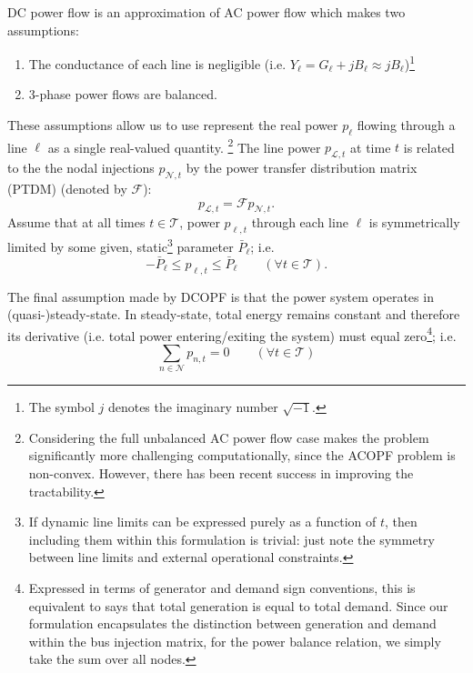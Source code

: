 \documentclass[journal,11pt]{IEEEtran}
\renewcommand{\L}{\mathcal{L}}
\newcommand{\T}{\mathcal{T}}
\newcommand{\N}{\mathcal{N}}
\begin{document}
DC power flow is an approximation of AC power flow which makes two assumptions:
\begin{enumerate}
  \item The conductance of each line is negligible (i.e. $Y_{\ell} = G_\ell + j B_\ell \approx j B_\ell$)\footnote{
    The symbol $j$ denotes the imaginary number $\sqrt{-1}$.
  }
  \item 3-phase power flows are balanced.
\end{enumerate}

These assumptions allow us to use represent the real power $p_{\ell}$ flowing through a line $\ell$ as a single
real-valued quantity.  \footnote{
  Considering the full unbalanced AC power flow case makes the problem significantly more
  challenging computationally, since the ACOPF problem is non-convex. However, there has been recent success in
  improving the tractability.\cite{vito_learning_2024}
} The line power $p_{\L, t}$ at time $t$ is related to the the nodal injections $p_{\N,t}$ by the power transfer
distribution matrix (PTDM) (denoted by $\mathcal{F}$):
\begin{equation}
  p_{\L, t} = \mathcal{F} p_{\N, t}.
\end{equation}
Assume that at all times $t\in\T$, power $p_{\ell,t}$ through each line $\ell$ is symmetrically limited by some given, 
static\footnote{
  If dynamic line limits can be expressed purely as a function of $t$, then including them within this formulation
  is trivial: just note the symmetry between line limits and external operational constraints.
}
parameter $\bar{P}_\ell$; i.e.
\begin{equation}
  -\bar{P}_\ell \leq p_{\ell,t} \leq \bar{P}_\ell  \qquad (\forall t\in\T).
\end{equation}



The final assumption made by DCOPF is that the power system operates in (quasi-)steady-state. In steady-state,
total energy remains constant and therefore its derivative (i.e. total power entering/exiting the system) must equal zero\footnote{
  Expressed in terms of generator and demand sign conventions, this is equivalent to says that total generation is equal to total demand.
  Since our formulation encapsulates the distinction between generation and demand within the bus injection matrix, for the power balance
  relation, we simply take the sum over all nodes.
}; i.e.
\begin{equation}
  \sum_{n\in\N} p_{n, t} = 0  \qquad (\forall t \in \T)
  \label{eq:nodal-power}
\end{equation}
\end{document}
